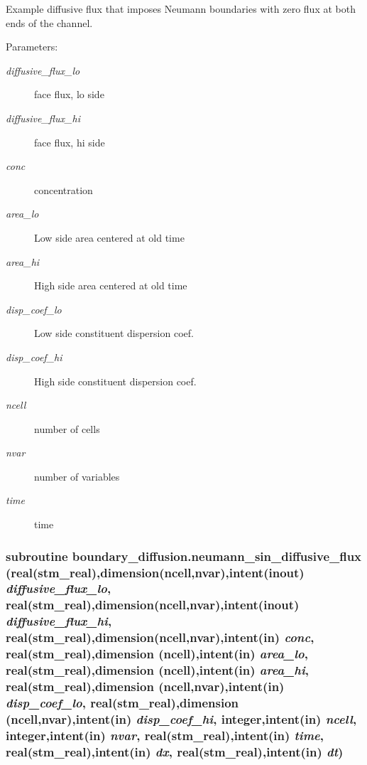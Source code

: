 Example diffusive flux that imposes Neumann boundaries with zero flux at both ends of the channel. 

\begin{Desc}
\item[Parameters:]
\begin{description}
\item[{\em diffusive\_\-flux\_\-lo}]face flux, lo side\item[{\em diffusive\_\-flux\_\-hi}]face flux, hi side\item[{\em conc}]concentration \item[{\em area\_\-lo}]Low side area centered at old time\item[{\em area\_\-hi}]High side area centered at old time\item[{\em disp\_\-coef\_\-lo}]Low side constituent dispersion coef.\item[{\em disp\_\-coef\_\-hi}]High side constituent dispersion coef.\item[{\em ncell}]number of cells\item[{\em nvar}]number of variables\item[{\em time}]time \end{description}
\end{Desc}
\hypertarget{a00054_761524f42d40b0d8f256c660648a1b6d}{
\subsubsection[{neumann\_\-sin\_\-diffusive\_\-flux}]{\setlength{\rightskip}{0pt plus 5cm}subroutine boundary\_\-diffusion.neumann\_\-sin\_\-diffusive\_\-flux (real(stm\_\-real),dimension(ncell,nvar),intent(inout) {\em diffusive\_\-flux\_\-lo}, \/  real(stm\_\-real),dimension(ncell,nvar),intent(inout) {\em diffusive\_\-flux\_\-hi}, \/  real(stm\_\-real),dimension(ncell,nvar),intent(in) {\em conc}, \/  real(stm\_\-real),dimension         (ncell),intent(in) {\em area\_\-lo}, \/  real(stm\_\-real),dimension         (ncell),intent(in) {\em area\_\-hi}, \/  real(stm\_\-real),dimension (ncell,nvar),intent(in) {\em disp\_\-coef\_\-lo}, \/  real(stm\_\-real),dimension (ncell,nvar),intent(in) {\em disp\_\-coef\_\-hi}, \/  integer,intent(in) {\em ncell}, \/  integer,intent(in) {\em nvar}, \/  real(stm\_\-real),intent(in) {\em time}, \/  real(stm\_\-real),intent(in) {\em dx}, \/  real(stm\_\-real),intent(in) {\em dt})}}
\label{a00054_761524f42d40b0d8f256c660648a1b6d}


